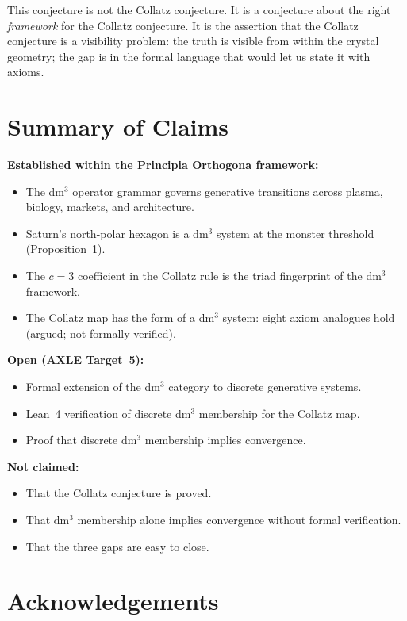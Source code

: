 \documentclass[11pt]{article}
\begin{document}
This conjecture is not the Collatz conjecture. It is a conjecture about the right \emph{framework}
for the Collatz conjecture. It is the assertion that the Collatz conjecture is a visibility problem:
the truth is visible from within the crystal geometry; the gap is in the formal language that would
let us state it with axioms.

\section*{Summary of Claims}

\noindent\textbf{Established within the Principia Orthogona framework:}
\begin{itemize}
  \item[$\checkmark$] The dm$^3$ operator grammar governs generative transitions across plasma,
    biology, markets, and architecture.
  \item[$\checkmark$] Saturn's north-polar hexagon is a dm$^3$ system at the monster threshold
    (Proposition~1).
  \item[$\checkmark$] The $c = 3$ coefficient in the Collatz rule is the triad fingerprint of the
    dm$^3$ framework.
  \item[$\checkmark$] The Collatz map has the form of a dm$^3$ system: eight axiom analogues hold
    (argued; not formally verified).
\end{itemize}

\noindent\textbf{Open (AXLE Target~5):}
\begin{itemize}
  \item[$\square$] Formal extension of the dm$^3$ category to discrete generative systems.
  \item[$\square$] Lean~4 verification of discrete dm$^3$ membership for the Collatz map.
  \item[$\square$] Proof that discrete dm$^3$ membership implies convergence.
\end{itemize}

\noindent\textbf{Not claimed:}
\begin{itemize}
  \item[$\times$] That the Collatz conjecture is proved.
  \item[$\times$] That dm$^3$ membership alone implies convergence without formal verification.
  \item[$\times$] That the three gaps are easy to close.
\end{itemize}

\section*{Acknowledgements}
\end{document}
